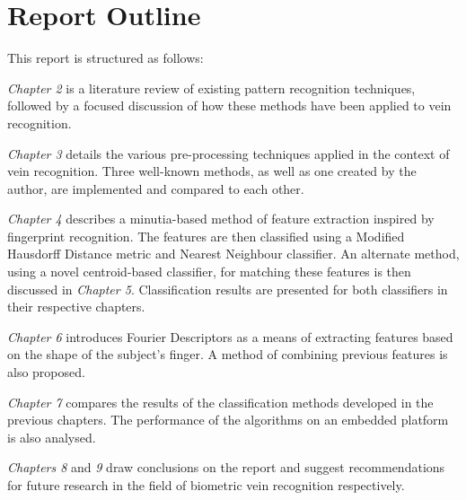 \section{Report Outline}
This report is structured as follows:
\par
\textit{Chapter 2} is a literature review of existing pattern recognition techniques, followed by a focused discussion of how these methods have been applied to vein recognition.
\par
\textit{Chapter 3} details the various pre-processing techniques applied in the context of vein recognition. Three well-known methods, as well as one created by the author, are implemented and compared to each other.
\par
\textit{Chapter 4} describes a minutia-based method of feature extraction inspired by fingerprint recognition. The features are then classified using a Modified Hausdorff Distance metric and Nearest Neighbour classifier. An alternate method, using a novel centroid-based classifier, for matching these features is then discussed in \textit{Chapter 5}. Classification results are presented for both classifiers in their respective chapters.
\par
\textit{Chapter 6} introduces Fourier Descriptors as a means of extracting features based on the shape of the subject's finger. A method of combining previous features is also proposed.  
\par
\textit{Chapter 7} compares the results of the classification methods developed in the previous chapters. The performance of the algorithms on an embedded platform is also analysed.
\par
\textit{Chapters 8} and \textit{9} draw conclusions on the report and suggest recommendations for future research in the field of biometric vein recognition respectively.  



